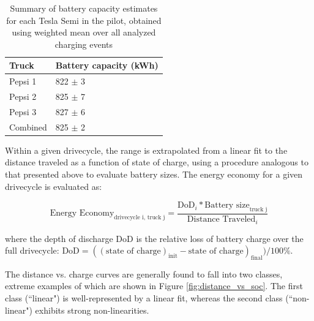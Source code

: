 \begin{table}[H]
\centering
\begin{tabular}{P{4cm}P{6cm}} %
\toprule %
\textbf{Truck} & \textbf{Battery capacity (kWh)} \\ \midrule %
Pepsi 1 & 822 $\pm$ 3 \\
\midrule
Pepsi 2 & 825 $\pm$ 7 \\
\midrule
Pepsi 3 & 827 $\pm$ 6 \\
\midrule
Combined & 825 $\pm$ 2 \\
\bottomrule %
\end{tabular}
\caption{Summary of battery capacity estimates for each Tesla Semi in the pilot, obtained using weighted mean over all analyzed charging events}
\label{tab:battery_capacity_summary}
\end{table}


Within a given drivecycle, the range is extrapolated from a linear fit to the distance traveled as a function of state of charge, using a procedure analogous to that presented above to evaluate battery sizes. The energy economy for a given drivecycle is evaluated as:

\begin{equation}
    \text{Energy Economy}_\text{drivecycle i, truck j} = \frac{\text{DoD}_i * \text{Battery size}_\text{truck j}}{\text{Distance Traveled}_i}
\end{equation}

where the depth of discharge DoD is the relative loss of battery charge over the full drivecycle: $\text{DoD} = ((\text{state of charge})_\text{init} - \text{state of charge})_\text{final}) / 100\%$.

The distance vs. charge curves are generally found to fall into two classes, extreme examples of which are shown in Figure \ref{fig:distance_vs_soc}. The first class (``linear") is well-represented by a linear fit, whereas the second class (``non-linear") exhibits strong non-linearities. 

